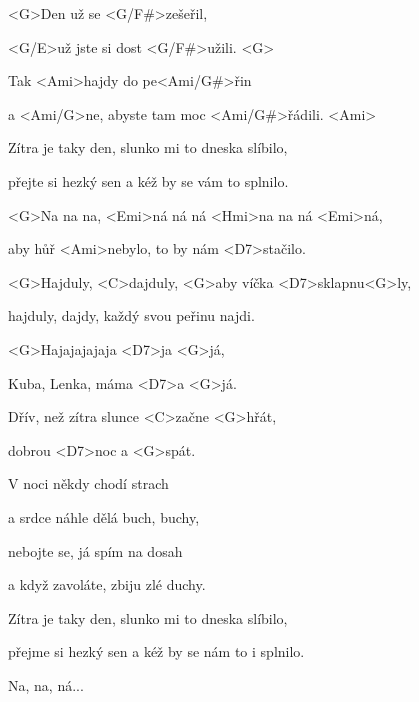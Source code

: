 

\zs
<G>Den už se <G/F#>zešeřil,

<G/E>už jste si dost <G/F#>užili. <G>

Tak <Ami>hajdy do pe<Ami/G#>řin

a <Ami/G>ne, abyste tam moc <Ami/G#>řádili. <Ami>

Zítra je taky den, slunko mi to dneska slíbilo,

přejte si hezký sen a kéž by se vám to splnilo.

<G>Na na na, <Emi>ná ná ná <Hmi>na na ná <Emi>ná,

aby hůř <Ami>nebylo, to by nám <D7>stačilo.
\ks

\zr
<G>Hajduly, <C>dajduly, <G>aby víčka 
<D7>sklapnu<G>ly, 

hajduly, dajdy, každý svou peřinu najdi.

<G>Hajajajajaja <D7>ja <G>já,

Kuba, Lenka, máma <D7>a <G>já.

Dřív, než zítra slunce <C>začne <G>hřát,

dobrou <D7>noc a <G>spát.
\kr

\zs
V noci někdy chodí strach

a srdce náhle dělá buch, buchy,

nebojte se, já spím na dosah

a když zavoláte, zbiju zlé duchy.

Zítra je taky den, slunko mi to dneska slíbilo,

přejme si hezký sen a kéž by se nám to i splnilo.

Na, na, ná...
\ks

\zr\kr

\kp





